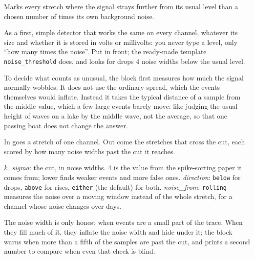 Marks every stretch where the signal strays further from its usual level than a chosen
number of times its own background noise.

As a first, simple detector that works the same on every channel, whatever its size and
whether it is stored in volts or millivolts: you never type a level, only ``how many times the
noise''. Put  in front; the ready-made template
\texttt{noise\_threshold} does, and looks for drops 4 noise widths below the usual level.

\begin{plainterms}
To decide what counts as unusual, the block first measures how much the signal normally
wobbles. It does not use the ordinary spread, which the events themselves would inflate.
Instead it takes the typical distance of a sample from the middle value, which a few large
events barely move: like judging the usual height of waves on a lake by the middle wave,
not the average, so that one passing boat does not change the answer.
\end{plainterms}

In goes a stretch of one channel. Out come the stretches that cross the cut, each scored by
how many noise widths past the cut it reaches.

\emph{k\_sigma}: the cut, in noise widths. 4 is the value from the spike-sorting paper it
comes from; lower finds weaker events and more false ones. \emph{direction}: \texttt{below} for
drops, \texttt{above} for rises, \texttt{either} (the default) for both.
\emph{noise\_from}: \texttt{rolling} measures the noise over a moving window instead of the
whole stretch, for a channel whose noise changes over days.

The noise width is only honest when events are a small part of the trace. When they fill much
of it, they inflate the noise width and hide under it; the block warns when more than a fifth of
the samples are past the cut, and prints a second number to compare when even that check is
blind.
